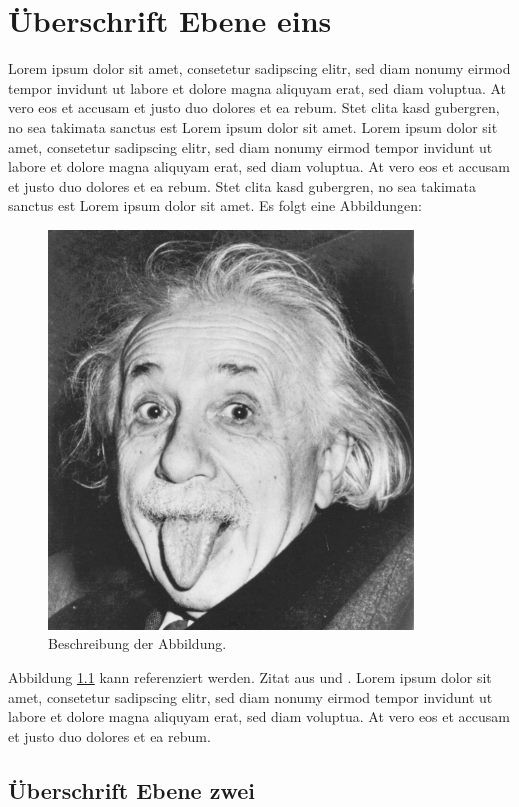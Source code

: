 \chapter{Überschrift Ebene eins}

Lorem ipsum dolor sit amet, consetetur sadipscing elitr, sed diam nonumy eirmod tempor invidunt ut labore et dolore magna aliquyam erat, sed diam voluptua. At vero eos et accusam et justo duo dolores et ea rebum. Stet clita kasd gubergren, no sea takimata sanctus est Lorem ipsum dolor sit amet. Lorem ipsum dolor sit amet, consetetur sadipscing elitr, sed diam nonumy eirmod tempor invidunt ut labore et dolore magna aliquyam erat, sed diam voluptua. At vero eos et accusam et justo duo dolores et ea rebum. Stet clita kasd gubergren, no sea takimata sanctus est Lorem ipsum dolor sit amet.
Es folgt eine Abbildungen:

\begin{figure}[htbp]
\centering
\includegraphics[scale=0.5]{einstein}
\caption{Beschreibung der Abbildung.}
\label{abb_einstein}
\end{figure}

Abbildung \ref{abb_einstein} kann referenziert werden. Zitat aus \cite{scheme} und \cite[17]{knuth}. Lorem ipsum dolor sit amet, consetetur sadipscing elitr, sed diam nonumy eirmod tempor invidunt ut labore et dolore magna aliquyam erat, sed diam voluptua. At vero eos et accusam et justo duo dolores et ea rebum.

\section{Überschrift Ebene zwei}


